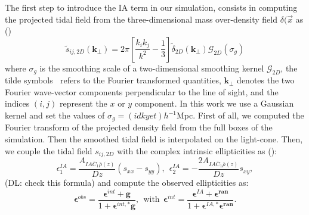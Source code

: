 \documentclass[twocolumn,twocolappendix]{aastex63}
\newcommand{\denise}[1]{{\color{red}DL: #1}}
\begin{document}
The first step to introduce the IA term in our simulation, consists in computing the projected tidal field from the three-dimensional mass over-density field $\delta(\vec{x}$
as (\cite{harnois2021cosmic})
\begin{equation}
   \tilde{s}_{ij,2D}(\textbf{k}_{\bot})=
   2 \pi 	\left [ \frac{k_ik_j}{k^2}- \frac{1}{3} \right ]
   \tilde{\delta}_{2D}(\textbf{k}_{\bot})
   \mathcal{G}_{2D}(\sigma_g)
\end{equation}
where $\sigma_g$ is the smoothing scale of a two-dimensional smoothing kernel $\mathcal{G}_{2D}$, the tilde symbols $~$ refers to the Fourier transformed quantities, $\textbf{k}_{\bot}$ denotes the two Fourier wave-vector components perpendicular to the line of sight, and the indices $(i,j)$ represent the $x$ or $y$ component.
In this work we use a Gaussian kernel and set the values of $\sigma_g=(idk yet) h^{-1}$Mpc.
First of all, we computed the Fourier transform of the projected density field from the full boxes of the simulation. 
Then the smoothed tidal field is interpolated on the light-cone. 
Then, we couple the tidal field $s_{ij,2D}$ with the complex intrinsic ellipticities as (\cite{harnois2021cosmic}):
\begin{equation}
    \epsilon_{1}^{IA}=\frac{A_{IA\bar{C}_1\bar{\rho}(z)}}{D{z}} (s_{xx}-s_{yy}), \ \ 
      \epsilon_{2}^{IA}=-\frac{2A_{IA\bar{C}_1\bar{\rho}(z)}}{D{z}} s_{xy},
\end{equation}
(\denise{check this formula})
and compute the observed ellipticities as:
\begin{equation}
    \boldsymbol{\epsilon}^{obs}=
    \frac{\boldsymbol{\epsilon}^{int}+\textbf{g}}{1+\boldsymbol{\epsilon}^{int,*}\textbf{g}}, \ \  \text{with}  \ \
    \boldsymbol{\epsilon}^{int}=
    \frac{\boldsymbol{\epsilon}^{
     IA}+\boldsymbol{\epsilon^{ran}}}
     {1+\boldsymbol{\epsilon}^{IA,*}\boldsymbol{\epsilon^{ran}}}.
\end{equation}



 
\end{document}
